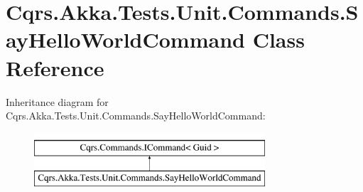 \hypertarget{classCqrs_1_1Akka_1_1Tests_1_1Unit_1_1Commands_1_1SayHelloWorldCommand}{}\section{Cqrs.\+Akka.\+Tests.\+Unit.\+Commands.\+Say\+Hello\+World\+Command Class Reference}
\label{classCqrs_1_1Akka_1_1Tests_1_1Unit_1_1Commands_1_1SayHelloWorldCommand}
Inheritance diagram for Cqrs.\+Akka.\+Tests.\+Unit.\+Commands.\+Say\+Hello\+World\+Command\+:\begin{figure}[H]
\begin{center}
\leavevmode
\includegraphics[height=2.000000cm]{classCqrs_1_1Akka_1_1Tests_1_1Unit_1_1Commands_1_1SayHelloWorldCommand}
\end{center}
\end{figure}
